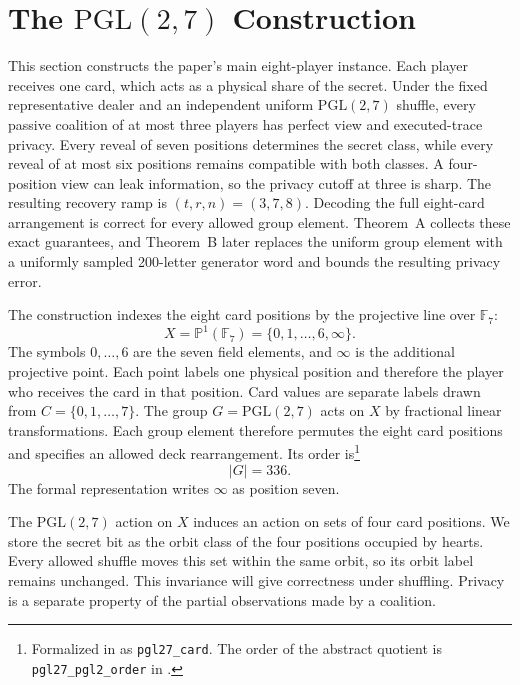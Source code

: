 \documentclass[runningheads]{llncs}
\newcommand{\coqin}[1]{\texttt{#1}}
\newcommand{\PG}{\mathrm{PGL}(2,7)}
\begin{document}
\section{The \texorpdfstring{$\PG$}{PGL(2,7)} Construction}\label{sec:pgl}

This section constructs the paper's main eight-player instance. Each player
receives one card, which acts as a physical share of the secret. Under the
fixed representative dealer and an independent uniform $\PG$ shuffle, every
passive coalition of at most three players has perfect view and
executed-trace privacy. Every reveal of seven positions determines the
secret class, while every reveal of at most six positions remains compatible
with both classes. A four-position view can leak information, so the privacy
cutoff at three is sharp. The resulting recovery ramp is
$(t,r,n)=(3,7,8)$. Decoding the full eight-card arrangement is correct for
every allowed group element. Theorem~A collects these exact guarantees, and
Theorem~B later replaces the uniform group element with a uniformly sampled
200-letter generator word and bounds the resulting privacy error.

The construction indexes the eight card positions by the projective line
over $\mathbb{F}_7$:
\[
  X=\mathbb{P}^1(\mathbb{F}_7)=\{0,1,\ldots,6,\infty\}.
\]
The symbols $0,\ldots,6$ are the seven field elements, and $\infty$ is the
additional projective point. Each point labels one physical position and
therefore the player who receives the card in that position. Card values are
separate labels drawn from $C=\{0,1,\ldots,7\}$. The group $G=\PG$ acts on
$X$ by fractional linear transformations. Each group element therefore
permutes the eight card positions and specifies an allowed deck
rearrangement. Its order is\footnote{Formalized in
 as \coqin{pgl27\_card}. The
order of the abstract quotient is \coqin{pgl27\_pgl2\_order} in
.}
\begin{equation}
  \lvert G\rvert=336.
  \label{eq:pgl-order}
\end{equation}
The formal representation writes $\infty$ as position seven.

The $\PG$ action on $X$ induces an action on sets of four card positions.
We store the secret bit as the orbit class of the four positions occupied by
hearts. Every allowed shuffle moves this set within the same orbit, so its
orbit label remains unchanged. This invariance will give correctness under
shuffling. Privacy is a separate property of the partial observations made
by a coalition.
\end{document}
